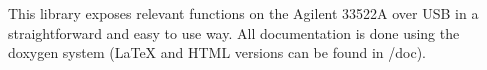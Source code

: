 This library exposes relevant functions on the Agilent 33522\+A over U\+S\+B in a straightforward and easy to use way. All documentation is done using the doxygen system (La\+Te\+X and H\+T\+M\+L versions can be found in /doc). 